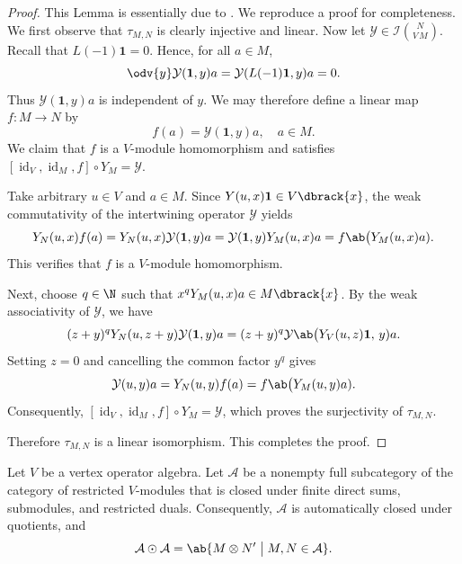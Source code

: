 \documentclass[12pt, english]{article}
\numberwithin{equation}{section}
\DeclareMathOperator{\id}{id}
\theoremstyle{plain}
\theoremstyle{definition}
\theoremstyle{remark}
\begin{document}
	\begin{proof}
		This Lemma is essentially due to \cite[Remark 4.11]{Li02b}. We reproduce a proof for completeness.
		We first observe that $\tau_{M, N}$ is clearly injective and linear.
		Now let $\mathcal{Y} \in \mathcal{I}\binom{N}{V\,M}$. Recall that $L(-1) \mathbf{1} = 0$. Hence, for all $a \in M$,
		\[
		\odv{y}\mathcal{Y}(\mathbf{1}, y) a = \mathcal{Y}(L(-1) \mathbf{1}, y) a = 0.
		\]
		Thus $\mathcal{Y}(\mathbf{1}, y) a$ is independent of $y$.
		We may therefore define a linear map $f\colon M \to N$ by
		\[
		f(a) = \mathcal{Y}(\mathbf{1}, y) a, \quad a \in M.
		\]
		We claim that $f$ is a $V$-module homomorphism and satisfies
		$[\id_V, \id_M, f] \circ Y_M = \mathcal{Y}$.
		
		Take arbitrary $u \in V$ and $a \in M$. Since $Y(u, x) \mathbf{1} \in V\dbrack{x}$, the weak commutativity of the intertwining operator $\mathcal{Y}$ yields
		\[
		Y_N(u, x) f(a) = Y_N(u, x) \mathcal{Y}(\mathbf{1}, y) a
		= \mathcal{Y}(\mathbf{1}, y) Y_M(u, x) a
		= f \ab\big(Y_M(u, x) a).
		\]
		This verifies that $f$ is a $V$-module homomorphism.
		
		Next, choose $q \in \N$ such that $x^q Y_M(u, x) a \in M\dbrack{x}$. By the weak associativity of $\mathcal{Y}$, we have
		\[
		(z+y)^q Y_N(u, z+y) \mathcal{Y}(\mathbf{1}, y) a
		= (z+y)^q \mathcal{Y} \ab\big(Y_V(u, z) \mathbf{1}, \,y) a.
		\]
		Setting $z = 0$ and cancelling the common factor $y^q$ gives
		\[
		\mathcal{Y}(u, y) a = Y_N(u, y) f(a) = f \ab\big(Y_M(u, y) a).
		\]
		Consequently, $[\id_V, \id_M, f] \circ Y_M = \mathcal{Y}$, which proves the surjectivity of $\tau_{M, N}$.
		
		Therefore $\tau_{M, N}$ is a linear isomorphism.  This completes the proof.
	\end{proof}
	
	Let $V$ be a vertex operator algebra.
	Let $\mathcal{A}$ be a nonempty full subcategory of the category of restricted $V$-modules that is closed under finite direct sums, submodules, and restricted duals. Consequently, $\mathcal{A}$ is automatically closed under quotients,  and
	\[
	\mathcal{A} \odot \mathcal{A} = \ab\{ M \otimes N^\prime \; \big | \; M, N \in \mathcal{A} \}.
	\]
	
\end{document}
